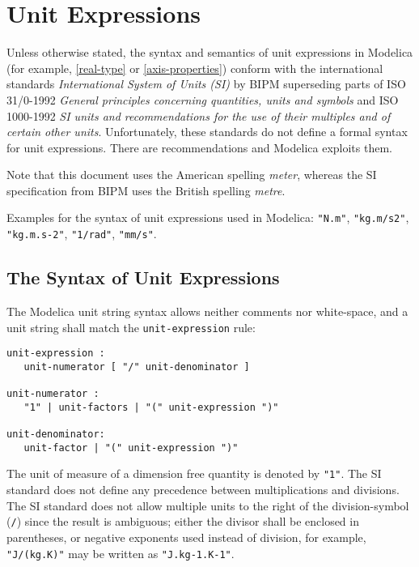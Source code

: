 \chapter{Unit Expressions}\label{unit-expressions}

Unless otherwise stated, the syntax and semantics of unit expressions in Modelica (for example, \cref{real-type} or \cref{axis-properties}) conform with the international standards \emph{International System of Units (SI)} by BIPM superseding parts of ISO 31/0-1992 \emph{General principles concerning quantities, units and symbols} and ISO 1000-1992 \emph{SI units and recommendations for the use of their multiples and of certain other units}.
Unfortunately, these standards do not define a formal syntax for unit expressions.
There are recommendations and Modelica exploits them.

Note that this document uses the American spelling \emph{meter}, whereas the SI specification from BIPM uses the British spelling \emph{metre}.

Examples for the syntax of unit expressions used in Modelica: \lstinline!"N.m"!, \lstinline!"kg.m/s2"!, \lstinline!"kg.m.s-2"!, \lstinline!"1/rad"!, \lstinline!"mm/s"!.

\section{The Syntax of Unit Expressions}\label{the-syntax-of-unit-expressions}

The Modelica unit string syntax allows neither comments nor white-space, and a unit string shall match the \lstinline[language=grammar]!unit-expression! rule:
\begin{lstlisting}[language=grammar]
unit-expression :
   unit-numerator [ "/" unit-denominator ]

unit-numerator :
   "1" | unit-factors | "(" unit-expression ")"

unit-denominator:
   unit-factor | "(" unit-expression ")"
\end{lstlisting}

The unit of measure of a dimension free quantity is denoted by \lstinline!"1"!.
The SI standard does not define any precedence between multiplications and divisions.
The SI standard does not allow multiple units to the right of the division-symbol (\lstinline!/!) since the result is ambiguous; either the divisor shall be enclosed in parentheses, or negative exponents used instead of division, for example, \lstinline!"J/(kg.K)"! may be written as \lstinline!"J.kg-1.K-1"!.

